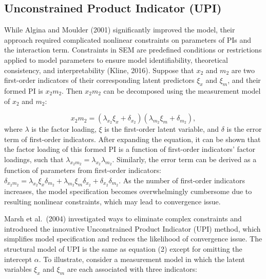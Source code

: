 \documentclass[
  man]{apa6}
\begin{document}
\hypertarget{unconstrained-product-indicator-upi}{%
\subsection{Unconstrained Product Indicator (UPI)}\label{unconstrained-product-indicator-upi}}

While Algina and Moulder (2001) significantly improved the model, their approach required complicated nonlinear constraints on parameters of PIs and the interaction term. Constraints in SEM are predefined conditions or restrictions applied to model parameters to ensure model identifiability, theoretical consistency, and interpretability (Kline, 2016). Suppose that \(x_{2}\) and \(m_{2}\) are two first-order indicators of their corresponding latent predictors \(\xi_{x}\) and \(\xi_{m}\), and their formed PI is \(x_{2}m_{2}\). Then \(x_{2}m_{2}\) can be decomposed using the measurement model of \(x_{2}\) and \(m_{2}\):

\begin{equation}
x_{2}m_{2}= (\lambda_{x_{2}}\xi_{x} + \delta_{x_{2}})(\lambda_{m_{2}}\xi_{m} + \delta_{m_{2}}),
\end{equation}
where \(\lambda\) is the factor loading, \(\xi\) is the first-order latent variable, and \(\delta\) is the error term of first-order indicators. After expanding the equation, it can be shown that the factor loading of this formed PI is a function of first-order indicators' factor loadings, such that \(\lambda_{x_{2}m_{2}} = \lambda_{x_{2}}\lambda_{m_{2}}\). Similarly, the error term can be derived as a function of parameters from first-order indicators: \(\delta_{x_{2}m_{2}} = \lambda_{x_{2}}\xi_{x}\delta_{m_{2}} + \lambda_{m_{2}}\xi_{m}\delta_{x_{2}} + \delta_{x_{2}}\delta_{m_{2}}\). As the number of first-order indicators increases, the model specification becomes overwhelmingly cumbersome due to resulting nonlinear constraints, which may lead to convergence issue.

Marsh et al.~(2004) investigated ways to eliminate complex constraints and introduced the innovative Unconstrained Product Indicator (UPI) method, which simplifies model specification and reduces the likelihood of convergence issue. The structural model of UPI is the same as equation (2) except for omitting the intercept \(\alpha\). To illustrate, consider a measurement model in which the latent variables \(\xi_{x}\) and \(\xi_{m}\) are each associated with three indicators:
\end{document}
